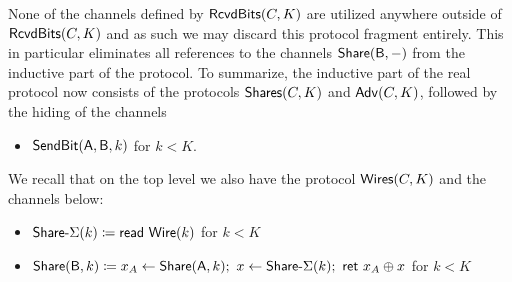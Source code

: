 None of the channels defined by $\mathsf{RcvdBits}(C,K)$ are utilized anywhere outside of $\mathsf{RcvdBits}(C,K)$ and as such we may discard this protocol fragment entirely. This in particular eliminates all references to the channels $\mathsf{Share}(\mathsf{B},-)$ from the inductive part of the protocol. To summarize, the inductive part of the real protocol now consists of the protocols $\mathsf{Shares}(C,K)$ and $\mathsf{Adv}(C,K)$, followed by the hiding of the channels
\begin{itemize}
\item $\mathsf{SendBit}(\mathsf{A},\mathsf{B},k)$ for $k < K$.
\end{itemize}
We recall that on the top level we also have the protocol $\mathsf{Wires}(C,K)$ and the channels below:
\begin{itemize}
\item $\mathsf{Share}\textsf{-}\Sigma(k) \coloneqq \mathsf{read} \ \mathsf{Wire}(k)$ for $k < K$
\item $\mathsf{Share}(\mathsf{B},k) \coloneqq x_A \leftarrow \mathsf{Share}(\mathsf{A},k); \ x \leftarrow \mathsf{Share}\textsf{-}\Sigma(k); \ \mathsf{ret} \ x_A \oplus x$ for $k < K$
\end{itemize}

